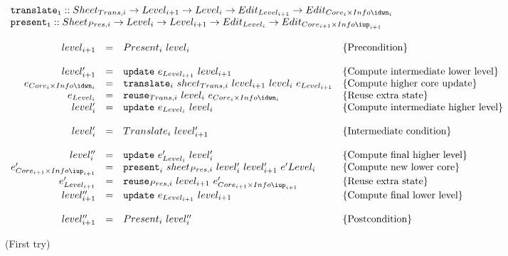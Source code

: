 \begin{small}\( \begin{array}{lcl}  \label{inv:incrementality}
{\tt translate_i}  ::  Sheet_{Trans,i} \rightarrow Level_{i+1} \rightarrow Level_{i} \rightarrow  Edit_{Level_{i+1}} \rightarrow Edit_{Core_{i}\times Info\idwn_{i}} \\
{\tt present_i}  ::  Sheet_{Pres,i} \rightarrow Level_{i} \rightarrow Level_{i+1}  \rightarrow Edit_{Level_{i}} \rightarrow Edit_{Core_{i+1}\times Info\iup_{i+1}}\\
\\
\end{array}\) \\
\( \begin{array}{rcll}  
level_{i+1} 	& = & Present_{i}~level_{i}						& \text{\{Precondition\}}\\
\\
level'_{i+1} 	& = & {\tt update}~e_{Level_{i+1}}~level_{i+1}                 & \text{\{Compute intermediate lower level\}}\\
e_{Core_{i} \times Info\idwn_{i}}  & = & {\tt translate}_{i}~sheet_{Trans,i}~level_{i+1}~level_{i}~e_{Level_{i+1}} & \text{\{Compute higher core update\}}\\
e_{Level_{i}} & = & {\tt reuse}_{Trans,i}~level_{i}~e_{Core_{i}\times Info\idwn_{i}}     & \text{\{Reuse extra state\}}\\
level'_{i} & = & {\tt update}~e_{Level_{i}}~level_{i}                 & \text{\{Compute intermediate higher level\}}\\
\\\
level'_{i} & = & Translate_{i}~level'_{i+1}						& \text{\{Intermediate condition\}}\\
\\
level''_{i} & = & {\tt update}~e'_{Level_{i}}~level'_{i}                 & \text{\{Compute final higher level\}}\\
e'_{Core_{i+1}\times Info\iup_{i+1}}  & = & {\tt present}_{i}~sheet_{Pres,i}~level'_{i}~level'_{i+1}~e'{Level_{i}} & \text{\{Compute new lower core\}}\\
e'_{Level_{i+1}} & = & {\tt reuse}_{Pres,i}~level_{i+1}~e'_{Core_{i+1}\times Info\iup_{i+1}} & \text{\{Reuse extra state\}}\\
level''_{i+1} & = & {\tt update}~e_{Level_{i+1}}~level_{i+1}                 & \text{\{Compute final lower level\}}\\
\\
level''_{i+1} & = & Present_{i}~level''_{i}						& \text{\{Postcondition\}}\\
\end{array}\)
\end{small}
\begin{center}(First try)\end{center}\vspace{1em}


